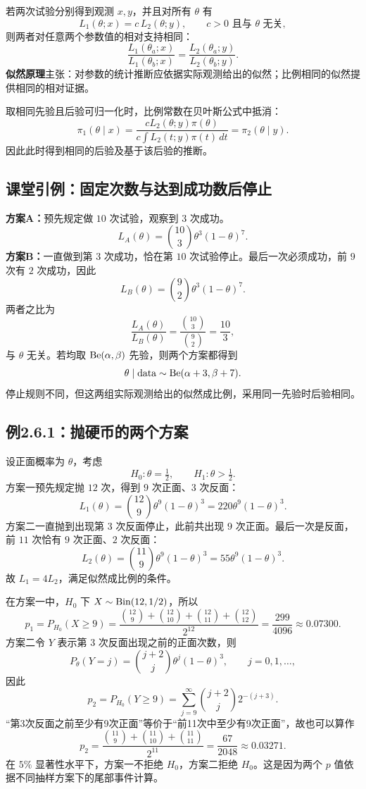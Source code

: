 若两次试验分别得到观测 $x,y$，并且对所有 $\theta$ 有
\[
L_1(\theta;x)=c\,L_2(\theta;y),\qquad c>0\text{ 且与 }\theta\text{ 无关},
\]
则两者对任意两个参数值的相对支持相同：
\[
\frac{L_1(\theta_a;x)}{L_1(\theta_b;x)}
=\frac{L_2(\theta_a;y)}{L_2(\theta_b;y)}.
\]
\textbf{似然原理}主张：对参数的统计推断应依据实际观测给出的似然；比例相同的似然提供相同的相对证据。

取相同先验且后验可归一化时，比例常数在贝叶斯公式中抵消：
\[
\pi_1(\theta\mid x)
=\frac{cL_2(\theta;y)\pi(\theta)}{c\int L_2(t;y)\pi(t)\,dt}
=\pi_2(\theta\mid y).
\]
因此此时得到相同的后验及基于该后验的推断。

\subsection{课堂引例：固定次数与达到成功数后停止}
\textbf{方案A：}预先规定做 $10$ 次试验，观察到 $3$ 次成功。
\[
L_A(\theta)=\binom{10}{3}\theta^3(1-\theta)^7.
\]
\textbf{方案B：}一直做到第 $3$ 次成功，恰在第 $10$ 次试验停止。最后一次必须成功，前 $9$ 次有 $2$ 次成功，因此
\[
L_B(\theta)=\binom92\theta^3(1-\theta)^7.
\]
两者之比为
\[
\frac{L_A(\theta)}{L_B(\theta)}=\frac{\binom{10}{3}}{\binom92}
=\frac{10}{3},
\]
与 $\theta$ 无关。若均取 $\operatorname{Be}(\alpha,\beta)$ 先验，则两个方案都得到
\[
\theta\mid\text{data}\sim\operatorname{Be}(\alpha+3,\beta+7).
\]
停止规则不同，但这两组实际观测给出的似然成比例，采用同一先验时后验相同。

\subsection{例2.6.1：抛硬币的两个方案}
设正面概率为 $\theta$，考虑
\[
H_0:\theta=\tfrac12,\qquad H_1:\theta>\tfrac12.
\]
方案一预先规定抛 $12$ 次，得到 $9$ 次正面、$3$ 次反面：
\[
L_1(\theta)=\binom{12}{9}\theta^9(1-\theta)^3
=220\theta^9(1-\theta)^3.
\]
方案二一直抛到出现第 $3$ 次反面停止，此前共出现 $9$ 次正面。最后一次是反面，前 $11$ 次恰有 $9$ 次正面、$2$ 次反面：
\[
L_2(\theta)=\binom{11}{9}\theta^9(1-\theta)^3
=55\theta^9(1-\theta)^3.
\]
故 $L_1=4L_2$，满足似然成比例的条件。

在方案一中，$H_0$ 下 $X\sim\operatorname{Bin}(12,1/2)$，所以
\[
p_1=P_{H_0}(X\geq9)
=\frac{\binom{12}{9}+\binom{12}{10}+\binom{12}{11}+\binom{12}{12}}{2^{12}}
=\frac{299}{4096}\approx0.07300.
\]
方案二令 $Y$ 表示第 $3$ 次反面出现之前的正面次数，则
\[
P_\theta(Y=j)=\binom{j+2}{j}\theta^j(1-\theta)^3,\qquad j=0,1,\ldots,
\]
因此
\[
p_2=P_{H_0}(Y\geq9)
=\sum_{j=9}^{\infty}\binom{j+2}{j}2^{-(j+3)}.
\]
“第3次反面之前至少有9次正面”等价于“前11次中至少有9次正面”，故也可以算作
\[
p_2=\frac{\binom{11}{9}+\binom{11}{10}+\binom{11}{11}}{2^{11}}
=\frac{67}{2048}\approx0.03271.
\]
在 $5\%$ 显著性水平下，方案一不拒绝 $H_0$，方案二拒绝 $H_0$。这是因为两个 $p$ 值依据不同抽样方案下的尾部事件计算。

